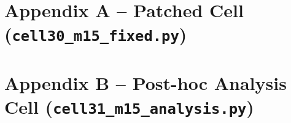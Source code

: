 \documentclass[11pt, a4paper]{article}
\begin{document}
\appendix
\section{Appendix A -- Patched Cell (\texttt{cell30\_m15\_fixed.py})}


\newpage
\section{Appendix B -- Post-hoc Analysis Cell (\texttt{cell31\_m15\_analysis.py})}

\end{document}
